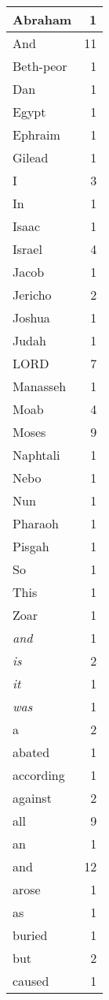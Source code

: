 \begin{center}
\begin{longtable}{l|r}
\hline \hline
\endlastfoot
Abraham & 1 \\ \hline
And & 11 \\ \hline
Beth-peor & 1 \\ \hline
Dan & 1 \\ \hline
Egypt & 1 \\ \hline
Ephraim & 1 \\ \hline
Gilead & 1 \\ \hline
I & 3 \\ \hline
In & 1 \\ \hline
Isaac & 1 \\ \hline
Israel & 4 \\ \hline
Jacob & 1 \\ \hline
Jericho & 2 \\ \hline
Joshua & 1 \\ \hline
Judah & 1 \\ \hline
LORD & 7 \\ \hline
Manasseh & 1 \\ \hline
Moab & 4 \\ \hline
Moses & 9 \\ \hline
Naphtali & 1 \\ \hline
Nebo & 1 \\ \hline
Nun & 1 \\ \hline
Pharaoh & 1 \\ \hline
Pisgah & 1 \\ \hline
So & 1 \\ \hline
This & 1 \\ \hline
Zoar & 1 \\ \hline
\emph{and} & 1 \\ \hline
\emph{is} & 2 \\ \hline
\emph{it} & 1 \\ \hline
\emph{was} & 1 \\ \hline
a & 2 \\ \hline
abated & 1 \\ \hline
according & 1 \\ \hline
against & 2 \\ \hline
all & 9 \\ \hline
an & 1 \\ \hline
and & 12 \\ \hline
arose & 1 \\ \hline
as & 1 \\ \hline
buried & 1 \\ \hline
but & 2 \\ \hline
caused & 1 \\ \hline

\end{longtable}
\end{center}
